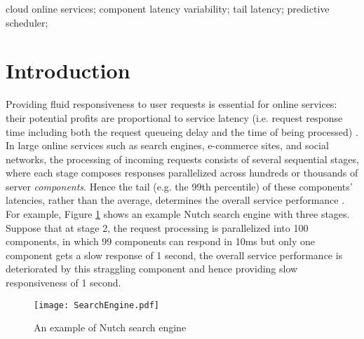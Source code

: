 \documentclass[10pt, conference, compsocconf]{IEEEtran}
\begin{document}
\begin{IEEEkeywords}
cloud online services; component latency variability; tail latency; predictive scheduler;

\end{IEEEkeywords}


\IEEEpeerreviewmaketitle



\section{Introduction}

Providing fluid responsiveness to user requests is essential for online services: their potential profits are proportional to service latency (i.e. request response time including both the request queueing delay and the time of being processed) \cite{jalaparti2013speeding,tailatScale}. In large online services such as search engines, e-commerce sites, and social networks, the processing of incoming requests consists of several sequential stages, where each stage composes responses parallelized across hundreds or thousands of server \emph{components}. Hence the tail (e.g. the 99th percentile) of these components' latencies, rather than the average, determines the overall service performance \cite{tailatScale,kapoor2012chronos}.
For example, Figure \ref{Fig: SearchEngine} shows an example Nutch search engine \cite{nutchsearch} with three stages. Suppose that at stage 2, the request processing is parallelized into 100 components, in which 99 components can respond in 10ms but only one component gets a slow response of 1 second, the overall service performance is deteriorated by this straggling component and hence providing slow responsiveness of 1 second.




\begin{figure}
\centering
  \texttt{[image: SearchEngine.pdf]}\\
  \caption{An example of Nutch search engine}
  \label{Fig: SearchEngine}
\end{figure}
\end{document}
